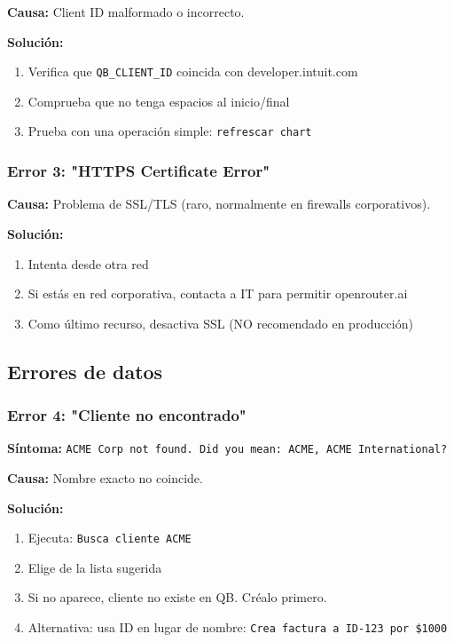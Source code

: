\documentclass[12pt,oneside]{article}
\begin{document}
\textbf{Causa:} Client ID malformado o incorrecto.

\textbf{Solución:}
\begin{enumerate}
    \item Verifica que \texttt{QB_CLIENT_ID} coincida con developer.intuit.com
    \item Comprueba que no tenga espacios al inicio/final
    \item Prueba con una operación simple: \texttt{refrescar chart}
\end{enumerate}

\subsubsection{Error 3: "HTTPS Certificate Error"}

\textbf{Causa:} Problema de SSL/TLS (raro, normalmente en firewalls corporativos).

\textbf{Solución:}
\begin{enumerate}
    \item Intenta desde otra red
    \item Si estás en red corporativa, contacta a IT para permitir openrouter.ai
    \item Como último recurso, desactiva SSL (NO recomendado en producción)
\end{enumerate}

\subsection{Errores de datos}

\subsubsection{Error 4: "Cliente no encontrado"}

\textbf{Síntoma:} \texttt{ACME Corp not found. Did you mean: ACME, ACME International?}

\textbf{Causa:} Nombre exacto no coincide.

\textbf{Solución:}
\begin{enumerate}
    \item Ejecuta: \texttt{Busca cliente ACME}
    \item Elige de la lista sugerida
    \item Si no aparece, cliente no existe en QB. Créalo primero.
    \item Alternativa: usa ID en lugar de nombre: \texttt{Crea factura a ID-123 por \$1000}
\end{enumerate}
\end{document}
